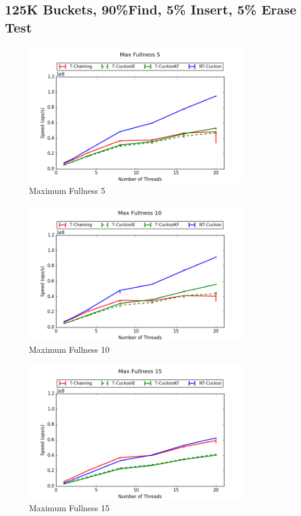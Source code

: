 \subsection{125K Buckets, 90\%Find, 5\% Insert, 5\% Erase Test}
\begin{figure}[H]
    \centering
	\includegraphics[width=0.85\textwidth]{maps/5HM125K:F90,I5,E5.png} 
        \caption*{Maximum Fullness 5}
\end{figure}
\begin{figure}[H]
    \centering
	\includegraphics[width=0.85\textwidth]{maps/10HM125K:F90,I5,E5.png} 
        \caption*{Maximum Fullness 10}
\end{figure}
\begin{figure}[H]
    \centering
	\includegraphics[width=0.85\textwidth]{maps/15HM1M:F90,I5,E5.png} 
        \caption*{Maximum Fullness 15}
\end{figure}


